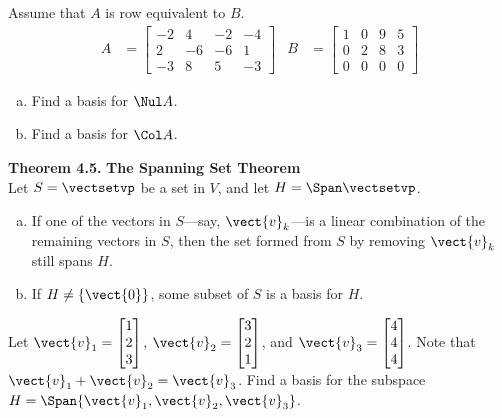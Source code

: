 \begin{exercise} %
	Assume that $A$ is row equivalent to $B$.
	\begin{align*}
	A &= \begin{bmatrix} -2&4&-2&-4 \\ 2&-6&-6&1 \\ -3&8&5&-3 \end{bmatrix} &
	B &= \begin{bmatrix} 1&0&9&5 \\ 0&2&8&3 \\ 0&0&0&0 \end{bmatrix}
	\end{align*}
	\begin{multicols}{2}
		\begin{enumerate}[(a)]
			\item Find a basis for $\Nul A$.
			\item Find a basis for $\Col A$.
		\end{enumerate}
	\end{multicols}
\end{exercise}
\vfill


\begin{boxthm}
	\textbf{Theorem 4.5.}
	\textbf{The Spanning Set Theorem} \\
	Let $S=\vectsetvp$ be a set in $V$, and let $H=\Span\vectsetvp$.
	\begin{enumerate}[a.]
		\item If one of the vectors in $S$---say, $\vect{v}_k$---is a linear combination of the remaining vectors in $S$, then the set formed from $S$ by removing $\vect{v}_k$ still spans $H$.
		\item If $H\neq\{\vect{0}\}$, some subset of $S$ is a basis for $H$.
	\end{enumerate}
\end{boxthm}
\begin{exercise} %
	Let $\vect{v}_1 = \begin{bmatrix} 1\\2\\3 \end{bmatrix}$, $\vect{v}_2 = \begin{bmatrix} 3\\2\\1 \end{bmatrix}$, and $\vect{v}_3 = \begin{bmatrix} 4\\4\\4 \end{bmatrix}$. Note that $\vect{v}_1+\vect{v}_2=\vect{v}_3$. Find a basis for the subspace $H=\Span\{\vect{v}_1,\vect{v}_2,\vect{v}_3\}$.
\end{exercise}
\vspace{1in}


